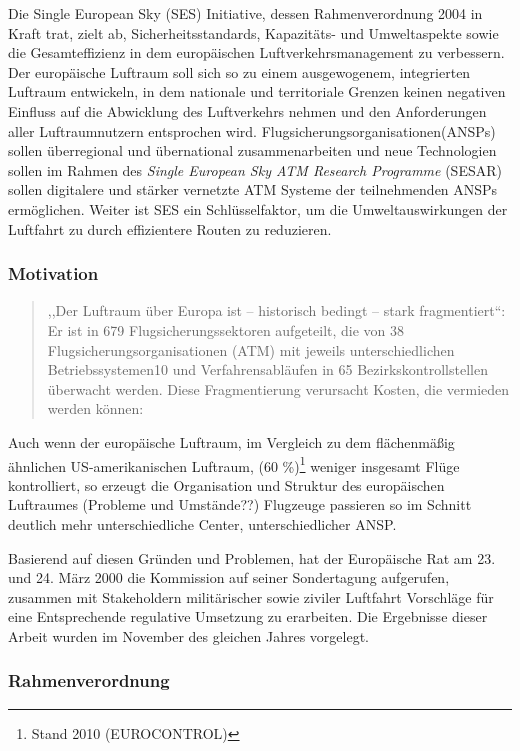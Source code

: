 

Die Single European Sky (SES) Initiative, dessen Rahmenverordnung 2004 in Kraft trat, zielt ab, Sicherheitsstandards, Kapazitäts- und Umweltaspekte sowie die Gesamteffizienz in dem europäischen Luftverkehrsmanagement zu verbessern.
Der europäische Luftraum soll sich so zu einem ausgewogenem, integrierten Luftraum entwickeln, in dem nationale und territoriale Grenzen keinen negativen Einfluss auf die Abwicklung des Luftverkehrs nehmen und den Anforderungen aller Luftraumnutzern entsprochen wird. \cite[Art. 1 Abs. 1]{2004R0549}
Flugsicherungsorganisationen(ANSPs) sollen überregional und übernational zusammenarbeiten und neue Technologien sollen im Rahmen des \textit{Single European Sky ATM Research Programme} (SESAR) sollen digitalere und stärker vernetzte ATM Systeme der teilnehmenden ANSPs ermöglichen.
Weiter ist SES ein Schlüsselfaktor, um die Umweltauswirkungen der Luftfahrt zu durch effizientere Routen zu reduzieren.  

\subsubsection{Motivation}
\begin{quote}
,,Der Luftraum über Europa ist – historisch bedingt – stark fragmentiert``:  Er ist in 679 Flugsicherungssektoren aufgeteilt, die von 38 Flugsicherungsorganisationen (ATM) mit jeweils unterschiedlichen
Betriebssystemen10 und Verfahrensabläufen in 65 Bezirkskontrollstellen überwacht werden. Diese Fragmentierung verursacht Kosten, die vermieden werden können:
\cite[S.6]{eu_ses_studie} 
\end{quote}
\noindent
Auch wenn der europäische Luftraum, im Vergleich zu dem flächenmäßig ähnlichen US-amerikanischen Luftraum, (60 \%)\footnote{Stand 2010 (EUROCONTROL)} weniger insgesamt Flüge kontrolliert, so erzeugt die Organisation und Struktur des europäischen Luftraumes (Probleme und Umstände??)
Flugzeuge passieren so im Schnitt deutlich mehr unterschiedliche Center, unterschiedlicher ANSP. 
\cite[S. 74]{eu_ses_fab}


Basierend auf diesen Gründen und Problemen, hat der Europäische Rat am 23. und 24. März 2000 die Kommission auf seiner Sondertagung aufgerufen, zusammen mit Stakeholdern militärischer sowie ziviler Luftfahrt Vorschläge für eine Entsprechende regulative Umsetzung zu erarbeiten.
Die Ergebnisse dieser Arbeit wurden im November des gleichen Jahres vorgelegt.
\cite[ErwG. 2]{2004R0549}


\pagebreak
\subsubsection{Rahmenverordnung}

